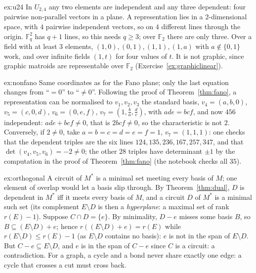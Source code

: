 \begin{solution}{ex:u24}
\idea In $U_{2,4}$ any two elements are independent and any three dependent: four pairwise non-parallel vectors in a plane.
\writeup A representation lies in a $2$-dimensional space, with $4$ pairwise independent vectors, so on $4$ different lines through the origin. $\mathbb F_q^2$ has $q+1$ lines, so this needs $q\ge3$; over $\mathbb F_2$ there are only three.
Over a field with at least $3$ elements, $(1,0),(0,1),(1,1),(1,a)$ with $a\notin\{0,1\}$ work, and over infinite fields $(1,t)$ for four values of $t$. It is not graphic, since graphic matroids are representable over $\mathbb F_2$
(Exercise~\ref{ex:graphiclinear}).
\end{solution}

\begin{solution}{ex:nonfano}
\idea Same coordinates as for the Fano plane; only the last equation changes from ``$=0$'' to ``$\ne0$''.
\writeup Following the proof of Theorem~\ref{thm:fano}, a representation can be normalised to $v_1,v_2,v_3$ the standard basis, $v_4=(a,b,0)$, $v_5=(c,0,d)$, $v_6=(0,e,f)$, $v_7=(1,\frac ba,\frac dc)$, with $ade=bcf$, and now $456$ independent:
$ade+bcf\ne0$, that is $2bcf\neq0$, so the characteristic is not $2$. Conversely, if $2\ne0$, take $a=b=c=d=e=f=1$, $v_7=(1,1,1)$: one checks that the dependent triples are the six lines $124,135,236,167,257,347$, and that
$\det(v_4,v_5,v_6)=-2\ne0$; the other $28$ triples have determinant $\pm1$ by the computation in the proof of Theorem~\ref{thm:fano} (the notebook checks all $35$).
\end{solution}

\begin{solution}{ex:orthogonal}
\idea A circuit of $M^*$ is a minimal set meeting every basis of $M$; one element of overlap would let a basis slip through.
\writeup By Theorem~\ref{thm:dual}, $D$ is dependent in $M^*$ iff it meets every basis of $M$, and a circuit $D$ of $M^*$ is a minimal such set (its complement $E\setminus D$ is then a \emph{hyperplane}: a maximal set of rank
$r(E)-1$). Suppose $C\cap D=\{e\}$. By minimality, $D-e$ misses some basis $B$, so $B\subseteq(E\setminus D)+e$; hence $r((E\setminus D)+e)=r(E)$ while $r(E\setminus D)\le r(E)-1$ (as $E\setminus D$ contains no basis): $e$ is not in the
span of $E\setminus D$. But $C-e\subseteq E\setminus D$, and $e$ is in the span of $C-e$ since $C$ is a circuit: a contradiction. For a graph, a cycle and a bond never share exactly one edge: a cycle that crosses a cut must
cross back.
\end{solution}

